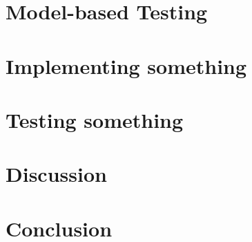 \documentclass[a4paper, 12pt,titlepage]{dithesis}
\begin{document}
\chapter{Model-based Testing}


\chapter{Implementing something}

\chapter{Testing something}

\chapter{Discussion}

\chapter{Conclusion}



\end{document}

